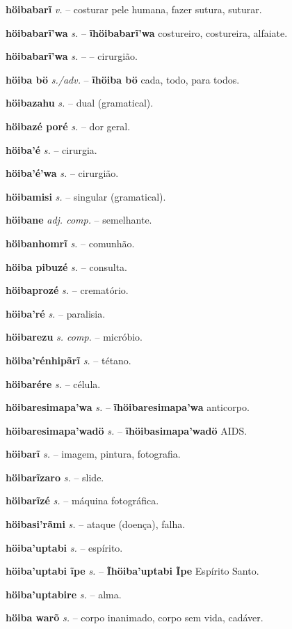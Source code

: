 \textbf{höibabarĩ} \textit{v.} -- costurar pele humana, fazer sutura, suturar.

\textbf{höibabarĩ'wa} \textit{s.} -- \textbf{ĩhöibabarĩ'wa} costureiro, costureira, alfaiate.

\textbf{höibabarĩ'wa} \textit{s.} -- -- cirurgião.

\textbf{höiba bö} \textit{s./adv.} -- \textbf{ĩhöiba bö} cada, todo, para todos.

\textbf{höibazahu} \textit{s.} -- dual (gramatical).

\textbf{höibazé poré} \textit{s.} -- dor geral.

\textbf{höiba'é} \textit{s.} -- cirurgia.

\textbf{höiba'é'wa} \textit{s.} -- cirurgião.

\textbf{höibamisi} \textit{s.} -- singular (gramatical).

\textbf{höibane} \textit{adj. comp.} -- semelhante.

\textbf{höibanhomrĩ} \textit{s.} -- comunhão.

\textbf{höiba pibuzé} \textit{s.} -- consulta.

\textbf{höibaprozé} \textit{s.} -- crematório.

\textbf{höiba'ré} \textit{s.} -- paralisia.

\textbf{höibarezu} \textit{s. comp.} -- micróbio.

\textbf{höiba'rénhipãrĩ} \textit{s.} -- tétano.

\textbf{höibarére} \textit{s.} -- célula.

\textbf{höibaresimapa'wa} \textit{s.} -- \textbf{ĩhöibaresimapa'wa} anticorpo.

\textbf{höibaresimapa'wadö} \textit{s.} -- \textbf{ĩhöibasimapa'wadö} AIDS.

\textbf{höibarĩ} \textit{s.} -- imagem, pintura, fotografia.

\textbf{höibarĩzaro} \textit{s.} -- slide.

\textbf{höibarĩzé} \textit{s.} -- máquina fotográfica.

\textbf{höibasi'rãmi} \textit{s.} -- ataque (doença), falha.

\textbf{höiba'uptabi} \textit{s.} -- espírito.

\textbf{höiba'uptabi ĩpe} \textit{s.} -- \textbf{Ĩhöiba'uptabi Ĩpe} Espírito Santo.

\textbf{höiba'uptabire} \textit{s.} -- alma.

\textbf{höiba warõ} \textit{s.} -- corpo inanimado, corpo sem vida, cadáver.

